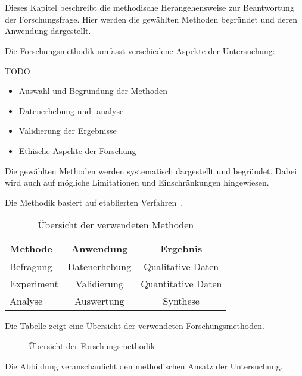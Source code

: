 
\chapter{\methodologyLabel}\label{cha:methodology}

Dieses Kapitel beschreibt die methodische Herangehensweise zur Beantwortung der Forschungsfrage. 
Hier werden die gewählten Methoden begründet und deren Anwendung dargestellt.

Die Forschungsmethodik umfasst verschiedene Aspekte der Untersuchung:

TODO

\begin{itemize}[leftmargin=0.63cm, label=\textbullet]
    \item Auswahl und Begründung der Methoden
    \item Datenerhebung und -analyse
    \item Validierung der Ergebnisse
    \item Ethische Aspekte der Forschung
\end{itemize}

Die gewählten Methoden werden systematisch dargestellt und begründet. Dabei wird auch auf mögliche Limitationen und Einschränkungen hingewiesen.

Die Methodik basiert auf etablierten Verfahren~\cite{mustermann2023}.

\begin{table}[htbp]
\centering
\caption{Übersicht der verwendeten Methoden}
\label{tab:methoden}
\begin{tabular}{lcc}
\toprule
Methode & Anwendung & Ergebnis \\
\midrule
Befragung & Datenerhebung & Qualitative Daten \\
Experiment & Validierung & Quantitative Daten \\
Analyse & Auswertung & Synthese \\
\bottomrule
\end{tabular}
\end{table}

Die Tabelle zeigt eine Übersicht der verwendeten Forschungsmethoden.

\begin{figure}[htbp]
\centering
\caption{Übersicht der Forschungsmethodik}
\label{fig:methodik}
\end{figure}

Die Abbildung veranschaulicht den methodischen Ansatz der Untersuchung.

